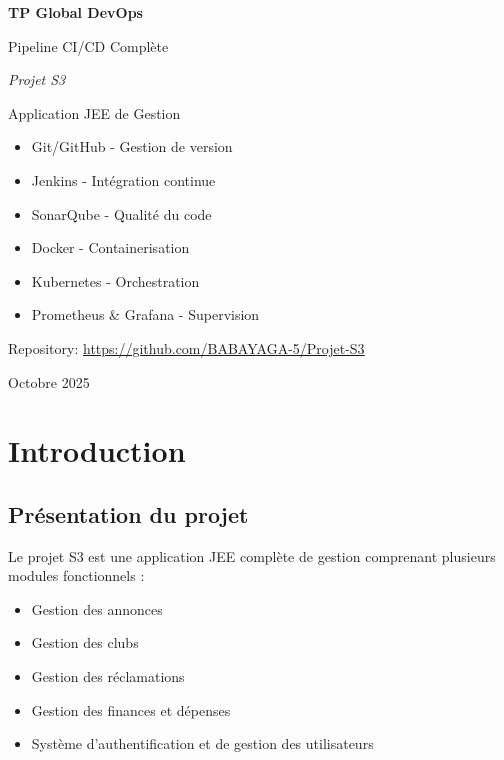 \documentclass[12pt,a4paper]{article}
\begin{document}
\begin{titlepage}
    \centering
    \vspace*{2cm}
    
    {\Huge\bfseries TP Global DevOps\par}
    \vspace{1cm}
    {\Large Pipeline CI/CD Complète\par}
    \vspace{1.5cm}
    
    {\Large\itshape Projet S3\par}
    {\large Application JEE de Gestion\par}
    
    \vspace{2cm}
    
    \begin{tcolorbox}[colback=blue!5!white,colframe=blue!75!black,title=Technologies utilisées]
        \begin{itemize}[leftmargin=*]
            \item Git/GitHub - Gestion de version
            \item Jenkins - Intégration continue
            \item SonarQube - Qualité du code
            \item Docker - Containerisation
            \item Kubernetes - Orchestration
            \item Prometheus \& Grafana - Supervision
        \end{itemize}
    \end{tcolorbox}
    
    \vfill
    
    {\large Repository: \url{https://github.com/BABAYAGA-5/Projet-S3}\par}
    \vspace{0.5cm}
    {\large Octobre 2025\par}
\end{titlepage}

\tableofcontents
\newpage

\section{Introduction}

\subsection{Présentation du projet}
Le projet S3 est une application JEE complète de gestion comprenant plusieurs modules fonctionnels :
\begin{itemize}
    \item Gestion des annonces
    \item Gestion des clubs
    \item Gestion des réclamations
    \item Gestion des finances et dépenses
    \item Système d'authentification et de gestion des utilisateurs
\end{itemize}
\end{document}
